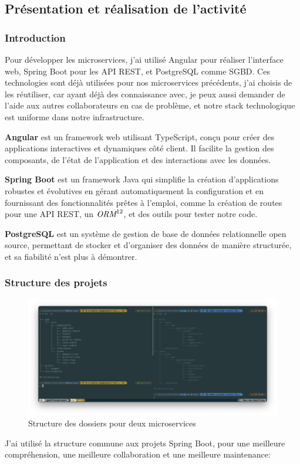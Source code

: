 \documentclass[a4paper, 11pt]{report}
\begin{document}
\subsection{Présentation et réalisation de l'activité}
\subsubsection{Introduction}
Pour développer les microservices, j'ai utilisé Angular pour réaliser
l'interface web, Spring Boot pour les API REST, et PostgreSQL comme
SGBD. Ces technologies sont déjà utilisées pour nos microservices
précédents, j'ai choisis de les réutiliser, car ayant déjà des
connaissance avec, je peux aussi demander de l'aide aux autres
collaborateurs en cas de problème, et notre stack technologique est
uniforme dans notre infrastructure.

\textbf{Angular} est un framework web utilisant TypeScript, conçu pour
créer des applications interactives et dynamiques côté client. Il
facilite la gestion des composants, de l'état de l'application et des
interactions avec les données.

\textbf{Spring Boot} est un framework Java qui simplifie la création
d'applications robustes et évolutives en gérant automatiquement la
configuration et en fournissant des fonctionnalités prêtes à l'emploi,
comme la création de routes pour une API REST, un $\emph{ORM}^{12}$, et des outils
pour tester notre code.

\textbf{PostgreSQL} est un système de gestion de base de données
relationnelle open source, permettant de stocker et d'organiser des
données de manière structurée, et sa fiabilité n'est plus à démontrer.
\subsubsection{Structure des projets}
  \begin{figure}[H]
      \centering
      \includegraphics[scale=0.35,center]{screenshots/directories.png}
      \caption{Structure des dossiers pour deux microservices}
  \end{figure}
J'ai utilisé la structure commune aux projets Spring Boot, pour une
meilleure compréhension, une meilleure collaboration et une meilleure
maintenance:
\end{document}
